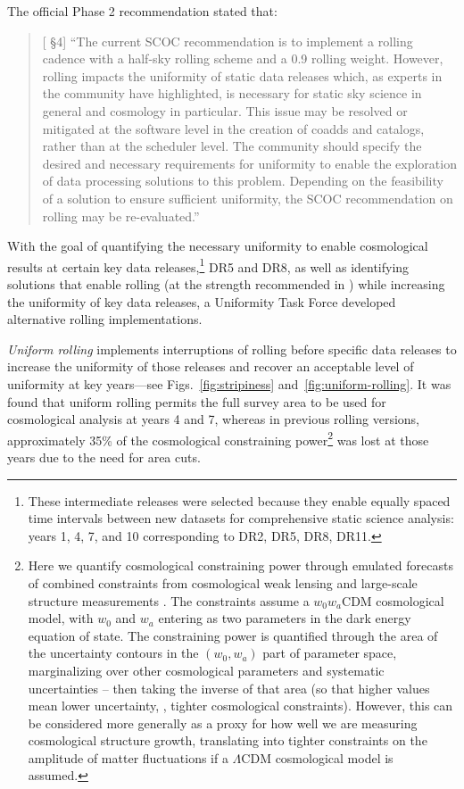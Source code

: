 The official Phase 2 recommendation stated that:
\vspace{-0.5cm}
\begin{quote}
     {[ \S4] 
     ``The current SCOC recommendation is to implement a rolling cadence with a half-sky rolling scheme and a 0.9 rolling weight. However, rolling impacts the uniformity of static data releases which, as experts in the community have highlighted, is necessary for static sky science in general and cosmology in particular. This issue may be resolved or mitigated at the software level in the creation of coadds and catalogs, rather than at the scheduler level. The community should specify the desired and necessary requirements for uniformity to enable the exploration of data processing solutions to this problem. Depending on the feasibility of a solution to ensure sufficient uniformity, the SCOC recommendation on rolling may be re-evaluated.'' }

 \end{quote}

 With the goal of quantifying the necessary uniformity to enable cosmological results at certain key data releases,\footnote{These intermediate releases were selected because they enable equally spaced time intervals between new datasets for comprehensive static science analysis: years 1, 4, 7, and 10 corresponding to DR2, DR5, DR8, DR11.} DR5 and DR8, as well as identifying solutions that enable rolling (at the strength recommended in ) while increasing the uniformity of key data releases, a Uniformity Task Force developed alternative rolling implementations. 
 
 {\it Uniform rolling} implements interruptions of rolling before specific data releases to increase the uniformity of those releases and recover an acceptable level of uniformity at key years---see Figs.~\ref{fig:stripiness} and~\ref{fig:uniform-rolling}.  It was found that uniform rolling permits the full survey area to be used for cosmological analysis at years 4 and 7, whereas in previous rolling versions, approximately 35\% of the cosmological constraining power\footnote{Here we quantify cosmological constraining power through emulated forecasts of combined constraints from cosmological weak lensing and large-scale structure measurements \citep{2022ApJS..259...58L}.  The constraints assume a $w_0 w_a$CDM cosmological model, with $w_0$ and $w_a$ entering as two parameters in the dark energy equation of state.  The constraining power is quantified through the area of the uncertainty contours in the $(w_0, w_a)$ part of parameter space, marginalizing over other cosmological parameters and systematic uncertainties -- then taking the inverse of that area (so that higher values mean lower uncertainty, \ie, tighter cosmological constraints).  However, this can be considered more generally as a proxy for how well we are measuring cosmological structure growth, translating into tighter constraints on the amplitude of matter fluctuations if a $\Lambda$CDM cosmological model is assumed.} was lost at those years due to the need for area cuts. 

